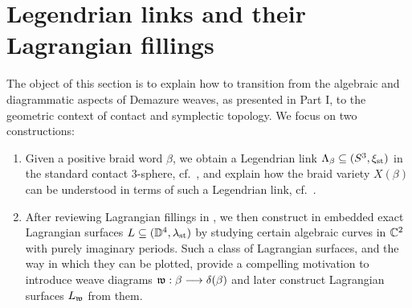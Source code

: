 \section{Legendrian links and their Lagrangian fillings}\label{sec:Legendrian_links_Lagrangian_fillings}

The object of this section is to explain how to transition from the algebraic and diagrammatic aspects of Demazure weaves, as presented in Part I, to the geometric context of contact and symplectic topology. We focus on two constructions:\\

\begin{enumerate}
    \item Given a positive braid word $\beta$, we obtain a Legendrian link $\Lambda_\beta\subseteq(S^3,\xi_{\text{st}})$ in the standard contact 3-sphere, cf.~, and explain how the braid variety $X(\beta)$ can be understood in terms of such a Legendrian link, cf.~.\\
    \item After reviewing Lagrangian fillings in , we then construct in  embedded exact Lagrangian surfaces $L\subseteq(\mathbb{D}^4,\lambda_{\text{st}})$ by studying certain algebraic curves in $\mathbb{C}^2$ with purely imaginary periods. Such a class of Lagrangian surfaces, and the way in which they can be plotted, provide a compelling motivation to introduce weave diagrams $\mathfrak{w}:\beta\longrightarrow\delta(\beta)$ and later construct Lagrangian surfaces $L_{\mathfrak{w}}$ from them.
\end{enumerate}

